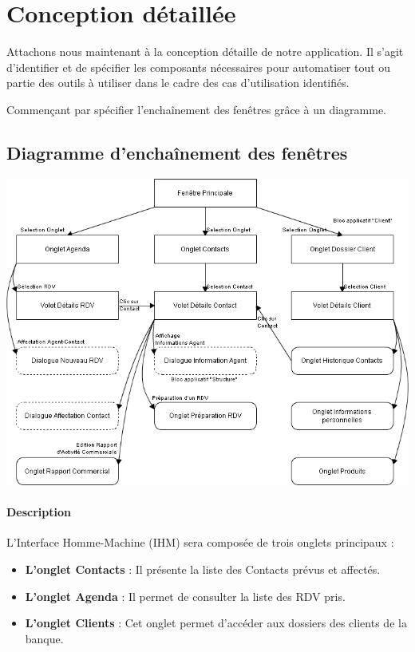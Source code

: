 
\section{Conception détaillée}

Attachons nous maintenant à la conception détaille de notre application. Il s'agit
d'identifier et de spécifier les composants nécessaires pour automatiser tout ou
partie des outils à utiliser dans le cadre des cas d'utilisation identifiés.

Commençant par spécifier l'enchaînement des fenêtres grâce à un diagramme.

\subsection{Diagramme d'enchaînement des fenêtres}

\begin {center}
\includegraphics[width=\textwidth]{diagramme-edf.png}
\end {center}

\paragraph{Description}

L'Interface Homme-Machine (IHM) sera composée de trois onglets
principaux :

\begin{itemize}
\item \textbf{L'onglet Contacts} : Il présente la liste des Contacts prévus et affectés.
\item \textbf{L'onglet Agenda} : Il permet de consulter la liste des RDV pris.
\item \textbf{L'onglet Clients} : Cet onglet permet d'accéder aux dossiers des clients de la banque.
\end{itemize}


